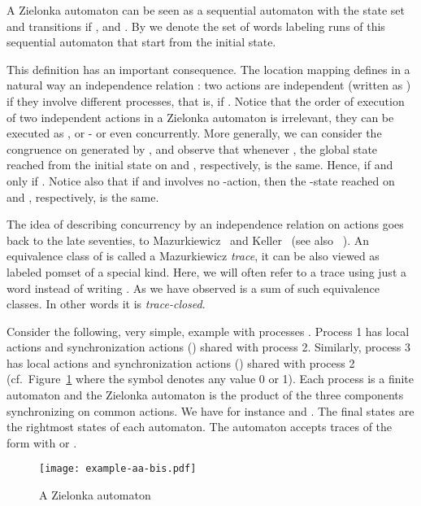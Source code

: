 \documentclass{llncs}
\begin{document}
A Zielonka automaton can be seen as a sequential automaton with the
state set  and transitions  if
, and . By  we denote the set of
words labeling runs of this sequential automaton that start from the
initial state.


This definition has an important consequence. The location mapping
 defines in a natural way an independence relation : two
actions  are independent (written as ) if they
involve different processes, that is, if . Notice that the order of execution of two independent
actions  in a Zielonka automaton is irrelevant, they can
be executed as , or  - or even concurrently. More generally,
we can consider the congruence  on  generated by ,
and observe that whenever , the global state reached from
the initial state on  and , respectively, is the same. Hence,  if and only if . Notice also that if  and  involves no -action, then the -state
reached on  and , respectively, is the same.



The idea of describing concurrency by an independence relation on
actions goes back to the late seventies, to Mazurkiewicz~\cite{maz77}
and Keller~\cite{kel73} (see also ~\cite{DieRoz95}). An equivalence
class  of  is called a Mazurkiewicz \emph{trace}, it can be
also viewed as labeled pomset of a special kind. Here, we will often
refer to a trace using just a word  instead of writing .  As
we have observed  is a sum of such equivalence classes. In
other words it is \emph{trace-closed}.



\begin{example}
  Consider the following, very simple, example with processes
  . Process 1 has local actions  and synchronization
  actions  () shared with process 2. Similarly,
  process 3 has local actions  and synchronization actions
   () shared with process 2
(cf.~Figure~\ref{f:async} where the symbol  denotes any 
value 0 or 1).
Each process is a finite automaton and the Zielonka
automaton is the product of the three components synchronizing on
common actions. 
We have for instance  and . The final states are the rightmost states of each automaton. The
automaton accepts traces of the form  with
 or .
\begin{figure}[htbp]
\centering
\texttt{[image: example-aa-bis.pdf]}
  \caption{A Zielonka automaton}
  \label{f:async}
\end{figure}
\end{example} 
\end{document}
